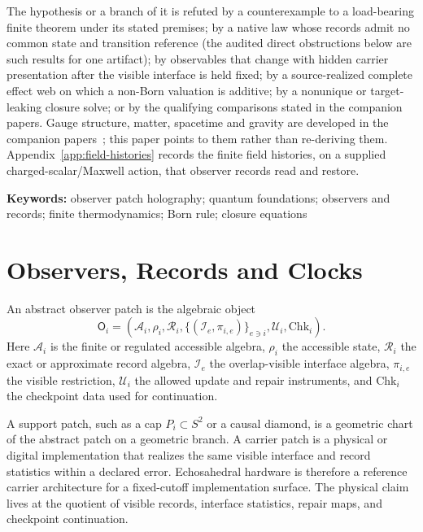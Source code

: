 \documentclass[11pt]{article}
\begin{document}
The hypothesis or a branch of it is refuted by a counterexample to a
load-bearing finite theorem under its stated premises; by a native law whose
records admit no common state and transition reference (the audited direct
obstructions below are such results for one artifact); by observables that
change with hidden carrier presentation after the visible interface is held
fixed; by a source-realized complete effect web on which a non-Born valuation
is additive; by a nonunique or target-leaking closure solve; or by the
qualifying comparisons stated in the companion papers. Gauge structure,
matter, spacetime and gravity are developed in the companion
papers~\cite{ophGauge,ophparticles,ophEinstein}; this paper points to them
rather than re-deriving them. Appendix~\ref{app:field-histories} records the
finite field histories, on a supplied charged-scalar/Maxwell action, that
observer records read and restore.

\noindent\textbf{Keywords:} observer patch holography; quantum foundations; observers and records;
finite thermodynamics; Born rule; closure equations





\tableofcontents
\newpage

\section{Observers, Records and Clocks}
\label{sec:observer-language}

An abstract observer patch is the algebraic object
\[
\mathsf O_i=
\left(
\mathcal A_i,\rho_i,\mathcal R_i,
\{(\mathcal I_e,\pi_{i,e})\}_{e\ni i},
\mathcal U_i,\mathrm{Chk}_i
\right).
\]
Here \(\mathcal A_i\) is the finite or regulated accessible algebra, \(\rho_i\) the accessible
state, \(\mathcal R_i\) the exact or approximate record algebra, \(\mathcal I_e\) the overlap-visible
interface algebra, \(\pi_{i,e}\) the visible restriction, \(\mathcal U_i\) the allowed update and
repair instruments, and \(\mathrm{Chk}_i\) the checkpoint data used for continuation.

A support patch, such as a cap \(P_i\subset S^2\) or a causal diamond, is a geometric chart of the
abstract patch on a geometric branch. A carrier patch is a physical or digital implementation that
realizes the same visible interface and record statistics within a declared error. Echosahedral
hardware is therefore a reference carrier architecture for a fixed-cutoff implementation surface.
The physical claim lives at the quotient of visible records, interface statistics, repair maps, and
checkpoint continuation.
\end{document}
